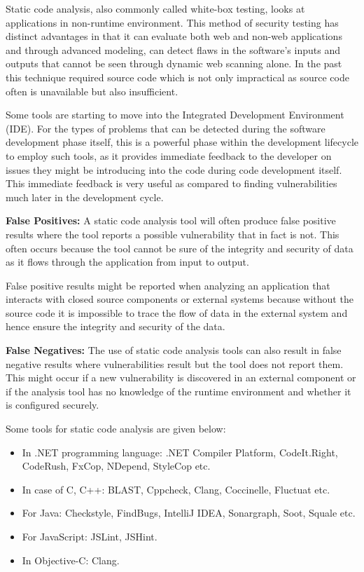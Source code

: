 Static code analysis, also commonly called white-box testing, looks at applications in non-runtime environment. This method of security testing has distinct advantages in that it can evaluate both web and non-web applications and through advanced modeling, can detect flaws in the software's inputs and outputs that cannot be seen through dynamic web scanning alone. In the past this technique required source code which is not only impractical as source code often is unavailable but also insufficient.

Some tools are starting to move into the Integrated Development Environment (IDE). For the types of problems that can be detected during the software development phase itself, this is a powerful phase within the development lifecycle to employ such tools, as it provides immediate feedback to the developer on issues they might be introducing into the code during code development itself. This immediate feedback is very useful as compared to finding vulnerabilities much later in the development cycle.

\textbf{False Positives:}
A static code analysis tool will often produce false positive results where the tool reports a possible vulnerability that in fact is not. This often occurs because the tool cannot be sure of the integrity and security of data as it flows through the application from input to output.

False positive results might be reported when analyzing an application that interacts with closed source components or external systems because without the source code it is impossible to trace the flow of data in the external system and hence ensure the integrity and security of the data.

\textbf{False Negatives:}
The use of static code analysis tools can also result in false negative results where vulnerabilities result but the tool does not report them. This might occur if a new vulnerability is discovered in an external component or if the analysis tool has no knowledge of the runtime environment and whether it is configured securely.

Some tools for static code analysis are given below:
\begin{itemize}
	\item In .NET programming language: .NET Compiler Platform, CodeIt.Right, CodeRush, FxCop, NDepend, StyleCop etc.
	\item In case of C, C++: BLAST, Cppcheck, Clang, Coccinelle, Fluctuat etc.  
	\item For Java: Checkstyle, FindBugs, IntelliJ IDEA, Sonargraph, Soot, Squale etc.
	\item For JavaScript: JSLint, JSHint. 
	\item In Objective-C: Clang.
\end{itemize}

